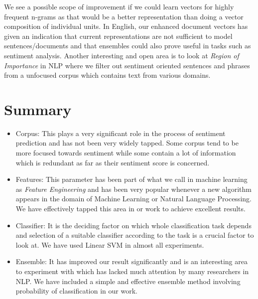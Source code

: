 We see a possible scope of improvement if we could learn vectors for highly frequent n-grams as that would be a better representation than doing a vector composition of individual units.
In English, our enhanced document vectors has given an indication that current representations are not sufficient to model sentences/documents and that ensembles could also prove useful in tasks such as sentiment analysis. Another interesting and open area is to look at \emph{Region of Importance} in NLP where we filter out sentiment oriented sentences and phrases from a unfocused corpus which contains text from various domains.

\section{Summary}
\label{sec:summary}
\begin{itemize}
	\item Corpus: This plays a very significant role in the process of sentiment prediction and has not been very widely tapped. Some corpus tend to be more focused towards sentiment while some contain a lot of information which is redundant as far as their sentiment score is concerned.
	\item Features: This parameter has been part of what we call in machine learning as \emph{Feature Engineering} and has been very popular whenever a new algorithm appears in the domain of Machine Learning or Natural Language Processing. We have effectively tapped this area in or work to achieve excellent results.
	\item Classifier: It is the deciding factor on which whole classification task depends and selection of a suitable classifier according to the task is a crucial factor to look at. We have used Linear SVM in almost all experiments.
	\item Ensemble: It has improved our result significantly and is an interesting area to experiment with which has lacked much attention by many researchers in NLP. We have included a simple and effective ensemble method involving probability of classification in our work.
\end{itemize}

